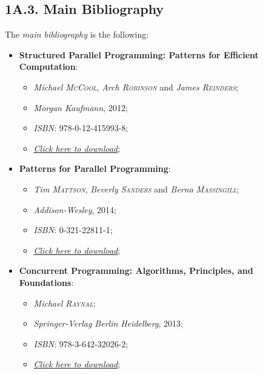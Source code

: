 \subsection*{\large{\textbf{1A.3. Main Bibliography}}}
\label{ssec:lecture-1A3}

\noindent The \emph{main bibliography} is the following:
\begin{itemize}
    \item \textbf{Structured Parallel Programming: Patterns for Efficient\\Computation}:
    \begin{itemize}
        \vspace{-0.2cm}
        \item \emph{Michael \textsc{McCool}}, \emph{Arch \textsc{Robinson}} and \emph{James \textsc{Reinders}};
        \item \emph{Morgan Kaufmann}, 2012;
        \item \emph{ISBN}: 978-0-12-415993-8;
        \item \href{https://github.com/rubenandrebarreiro/fct-nova-concurrency-and-parallelism-labs/raw/main/books/main-bibliography/structured-parallel-programming-patterns-for-efficient-computation-michael-mccool-arch-robison-and-james-reinders.pdf}{\emph{Click here to download}};
    \end{itemize}
    \item \textbf{Patterns for Parallel Programming}:
    \begin{itemize}
        \vspace{-0.2cm}
        \item \emph{Tim \textsc{Mattson}}, \emph{Beverly \textsc{Sanders}} and \emph{Berna \textsc{Massingill}};
        \item \emph{Addison-Wesley}, 2014;
        \item \emph{ISBN}: 0-321-22811-1;
        \item \href{https://github.com/rubenandrebarreiro/fct-nova-concurrency-and-parallelism-labs/raw/main/books/main-bibliography/patterns-for-parallel-programming-tim-mattson-beverly-sanders-and-berna-massingill.pdf}{\emph{Click here to download}};
    \end{itemize}
    \newpage
    \item \textbf{Concurrent Programming: Algorithms, Principles, and\\Foundations}:
    \begin{itemize}
        \vspace{-0.2cm}
        \item \emph{Michael \textsc{Raynal}};
        \item \emph{Springer-Verlag Berlin Heidelberg}, 2013;
        \item \emph{ISBN}: 978-3-642-32026-2;
        \item \href{https://github.com/rubenandrebarreiro/fct-nova-concurrency-and-parallelism-labs/raw/main/books/main-bibliography/concurrent-programming-algorithms-principles-and-foundations-michel-raynal.pdf}{\emph{Click here to download}};
    \end{itemize}
\end{itemize}

